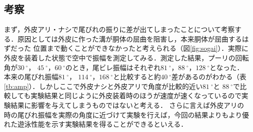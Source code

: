\newpage
\subsection{考察}
まず，外皮アリ・ナシで尾びれの振りに差が出てしまったことについて考察する．原因としては外皮に作った溝が胴体の屈曲を阻害し，本来胴体が屈曲するはずだった
位置まで動くことができなかったと考えられる（図\ref{fig:sogai}）．実際に外皮を装着した状態で空中で振幅を測定してみる．測定した結果，プーリの回転角が$30\:^\circ$，
$45\:^\circ$，$60\:^\circ$のとき，尾ビレ振幅はそれぞれ$81\:^\circ$，$88\:^\circ$，$128\:^\circ$となった．本来の尾びれ振幅$81\:^\circ$，
$114\:^\circ$，$168\:^\circ$と比較すると約$40\:^\circ$差があるのがわかる（表\ref{tb:amp}）．しかしここで外皮ナシと外皮アリで角度が比較的近い$81\:^\circ$と
$88\:^\circ$で比較しても実験結果と同じように外皮装着時のほうが速度が速くなっているので実験結果に影響を与えてしまうものではないと考える．
さらに言えば外皮アリの時の尾びれ振幅を実際の角度に近づけて実験を行えば，今回の結果よりもより優れた遊泳性能を示す実験結果を得ることができるといえる．

